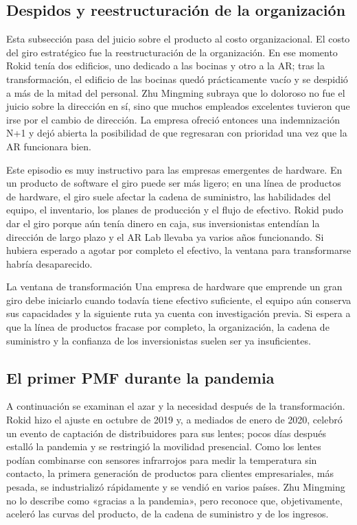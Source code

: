 \documentclass[a4paper]{article}
\begin{document}
\subsection{Despidos y reestructuración de la organización}

Esta subsección pasa del juicio sobre el producto al costo organizacional. El costo del giro estratégico fue la reestructuración de la organización. En ese momento Rokid tenía dos edificios, uno dedicado a las bocinas y otro a la AR; tras la transformación, el edificio de las bocinas quedó prácticamente vacío y se despidió a más de la mitad del personal. Zhu Mingming subraya que lo doloroso no fue el juicio sobre la dirección en sí, sino que muchos empleados excelentes tuvieron que irse por el cambio de dirección. La empresa ofreció entonces una indemnización N+1 y dejó abierta la posibilidad de que regresaran con prioridad una vez que la AR funcionara bien.

Este episodio es muy instructivo para las empresas emergentes de hardware. En un producto de software el giro puede ser más ligero; en una línea de productos de hardware, el giro suele afectar la cadena de suministro, las habilidades del equipo, el inventario, los planes de producción y el flujo de efectivo. Rokid pudo dar el giro porque aún tenía dinero en caja, sus inversionistas entendían la dirección de largo plazo y el AR Lab llevaba ya varios años funcionando. Si hubiera esperado a agotar por completo el efectivo, la ventana para transformarse habría desaparecido.

\begin{importantbox}{La ventana de transformación}
Una empresa de hardware que emprende un gran giro debe iniciarlo cuando todavía tiene efectivo suficiente, el equipo aún conserva sus capacidades y la siguiente ruta ya cuenta con investigación previa. Si espera a que la línea de productos fracase por completo, la organización, la cadena de suministro y la confianza de los inversionistas suelen ser ya insuficientes.
\end{importantbox}

\subsection{El primer PMF durante la pandemia}

A continuación se examinan el azar y la necesidad después de la transformación. Rokid hizo el ajuste en octubre de 2019 y, a mediados de enero de 2020, celebró un evento de captación de distribuidores para sus lentes; pocos días después estalló la pandemia y se restringió la movilidad presencial. Como los lentes podían combinarse con sensores infrarrojos para medir la temperatura sin contacto, la primera generación de productos para clientes empresariales, más pesada, se industrializó rápidamente y se vendió en varios países. Zhu Mingming no lo describe como «gracias a la pandemia», pero reconoce que, objetivamente, aceleró las curvas del producto, de la cadena de suministro y de los ingresos.
\end{document}
